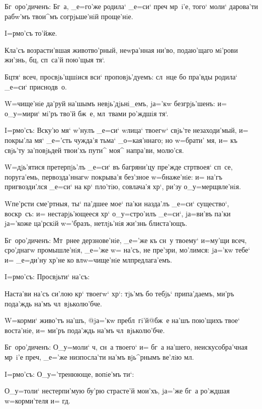 Бг~оро'диченъ: Бг~а, _е=го'же родила` _е=си` преч 
мр~i'е, того` моли` дарова'ти рабw'мъ твои^мъ 
согрjьше'нiй проще'нiе.

 I=рмо'съ то'йже.

Кла'съ возрасти'вшая животво'рный, неwра'нная ни'во, 
подаю'щаго мi'рови жи'знь, бц, сп~са'й пою'щыя тя`.

Бц тя` всеч, просвjь'щшiися вси` 
проповjь'дуемъ: сл~нце бо пра'вды родила` _е=си` 
приснодв~о.

W=чище'нiе да'руй на'шымъ невjь'дjьнi_емъ, jа='кw 
безгрjь'шенъ: и= о_у=мири` мi'ръ тво'й бж~е, мл~твами 
ро'ждшiя тя`.


I=рмо'съ: Вску'ю мя` w'нулъ _е=си` w\т лица` 
твоегw` свjь'те незаходи'мый, и= покры'ла мя` _е='сть 
чужда'я тьма` _о=кая'ннаго; но w=брати' мя, и= къ свjь'ту 
за'повjьдей твои'хъ пути^ моя^ напра'ви, молю'ся.

W=дjь'ятися претерпjь'лъ _е=си` въ багряни'цу пре'жде 
стр твоея` сп~се, поруга'емь, первозда'ннагw 
покрыва'я без'зное w=бнаже'нiе: и= на'гъ 
пригвозди'лся _е=си` на кр` пло'тiю, совлача'я 
хр`, ри'зу о_у=мерщвле'нiя.

W\т пе'рсти сме'ртныя, ты` па'дшее мое` па'ки назда'лъ 
_е=си` существо`, воскр~съ: и= нестарjь'ющееся хр` 
о_у=стро'илъ _е=си`, jа=ви'въ па'ки jа='коже ца'рскiй 
w='бразъ, нетлjь'нiя жи'знь блиста'ющъ.

Бг~оро'диченъ: Мт~рнее дерзнове'нiе, _е='же къ сн~у 
твоему` и=му'щи всеч, сро'днагw промышле'нiя, _е='же 
w= на'съ, не пре'зри, мо'лимся: jа='кw тебе` и= _е=ди'ну 
хр'не ко вл w=чище'нiе мл предлага'емъ.

 I=рмо'съ: Просвjьти` на'съ:

Наста'ви на'съ си'лою кр` твоегw` хр`: тjь'мъ 
бо тебjь` припа'даемъ, ми'ръ пода'ждь на'мъ 
чл~вjьколю'бче.

W=корми` живо'тъ на'шъ, @jа='кw пребл~гi'й@{бж~е 
на'шъ} пою'щихъ твое` воста'нiе, и= ми'ръ пода'ждь на'мъ 
чл~вjьколю'бче.

Бг~оро'диченъ: О_у=моли` ч, сн~а твоего` и= бг~а 
на'шего, неискусобра'чная мр~i'е преч, _е='же 
низпосла'ти на'мъ вjь^рнымъ ве'лiю мл.

 I=рмо'съ: О_у='тренююще, вопiе'мъ ти`:

О_у=толи` нестерпи'мую бу'рю страсте'й мои'хъ, jа='же 
бг~а ро'ждшая w=корми'теля и= гд.

